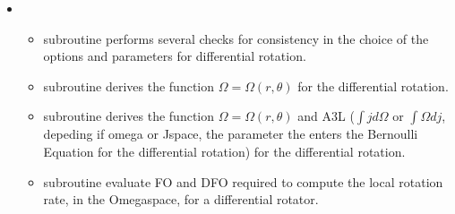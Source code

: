 \documentclass[letterpaper,10pt,english]{sphinxmanual}
\begin{document}
\begin{itemize}
\begin{itemize}
\item {} 
\sphinxAtStartPar
subroutine  and subroutine  \sphinxhyphen{} solve respectively for the Maxwell\sphinxhyphen{}Ampere and Maxwell\sphinxhyphen{}Gauss equations.

\item {} 
\sphinxAtStartPar
subroutine  \sphinxhyphen{} solves the equations \(\Phi _\mathrm{a} \big |_{S _\mathrm{NS}} = \Sigma _l Y(\theta) (a_l r^l) |_{S _\mathrm{NS}}\) (inside the star) and \(\Phi _\mathrm{a} \big |_{S _\mathrm{NS}} = \Sigma _l Y(\theta) (b_l r^{-(l+1)}) |_{S _\mathrm{NS}}\) (outside the star), where \(S _\mathrm{NS}\) is stellar surface and \(\Phi _\mathrm{a} \big |_{S _\mathrm{NS}} = (\Phi + \Omega \Psi + C) |_{S _\mathrm{NS}}\). Each system of equations is solved with a LU decomposition and a subsequent backward substitution adopting the routines provided in the Numerical Recipes (ludcmp and
lubksb). Notice that, in order to avoid spurious effects, the surface terms are evaluated on top
of the super\sphinxhyphen{}ellipsoid that best fit the numerical surface.


\end{itemize}

\item {} 
\sphinxAtStartPar
{}
\begin{itemize}
\item {} 
\sphinxAtStartPar
subroutine  \sphinxhyphen{} performs several checks for consistency in the choice of the options and parameters for differential rotation.

\item {} 
\sphinxAtStartPar
subroutine  \sphinxhyphen{} derives the function \(\Omega = \Omega (r,\theta)\) for the differential rotation.

\item {} 
\sphinxAtStartPar
subroutine  \sphinxhyphen{} derives the function \(\Omega = \Omega (r,\theta)\) and A3L (\(\int jd\Omega\) or \(\int \Omega dj\), depeding if omega or J\sphinxhyphen{}space, the parameter the enters the Bernoulli Equation for the differential rotation) for the differential rotation.

\item {} 
\sphinxAtStartPar
subroutine  \sphinxhyphen{} evaluate FO and DFO required to compute the local rotation rate, in the Omega\sphinxhyphen{}space, for a differential rotator.


\end{itemize}
\end{itemize}
\end{document}

